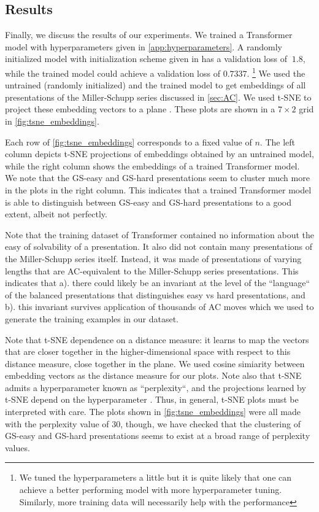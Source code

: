 \subsection{Results\label{sec:transformer_results}}
Finally, we discuss the results of our experiments. We trained a Transformer model with hyperparameters given in  \autoref{app:hyperparameters}. A randomly initialized model with initialization scheme given in \cite{Radford2019LanguageMA} has a validation loss of $~1.8$, while the trained model could achieve a validation loss of $0.7337$.
\footnote{We tuned the hyperparameters a little but it is quite likely that one can achieve a better performing model with more hyperparameter tuning. Similarly, more training data will necessarily help with the performance}
We used the untrained (randomly initialized) and the trained model to get embeddings of all presentations of the Miller-Schupp series discussed in \autoref{sec:AC}. We used t-SNE to project these embedding vectors to a plane \cite{JMLR:v9:vandermaaten08a}. These plots are shown in a $7 \times 2$ grid in \autoref{fig:tsne_embeddings}.

Each row of \autoref{fig:tsne_embeddings} corresponds to a fixed value of $n$. The left column depicts t-SNE projections of embeddings obtained by an untrained model, while the right column shows the embeddings of a trained Transformer model. We note that the GS-easy and GS-hard presentations seem to cluster much more in the plots in the right column. This indicates that a trained Transformer model is able to distinguish between GS-easy and GS-hard presentations to a good extent, albeit not perfectly. 

Note that the training dataset of Transformer contained no information about the easy of solvability of a presentation. It also did not contain many presentations of the Miller-Schupp series itself. Instead, it was made of presentations of varying lengths that are AC-equivalent to the Miller-Schupp series presentations. This indicates that a). there could likely be an invariant at the level of the ``language`` of the balanced presentations that distinguishes easy vs hard presentations, and b). this invariant survives application of thousands of AC moves which we used to generate the 
training examples in our dataset. 

 Note that t-SNE dependence on a distance measure: it learns to map the vectors that are closer together in the higher-dimensional space with respect to this distance measure, close together in the plane. We used cosine simiarity between embedding vectors as the distance measure for our plots. Note also that t-SNE admits a hyperparameter known as ``perplexity``, and the projections learned by t-SNE depend on the hyperparameter \cite{wattenberg2016how}. Thus, in general, t-SNE plots must be interpreted with care. The plots shown in \autoref{fig:tsne_embeddings} were all made with the perplexity value of $30$, though, we have checked that the clustering of GS-easy and GS-hard presentations seems to exist at a broad range of perplexity values.




